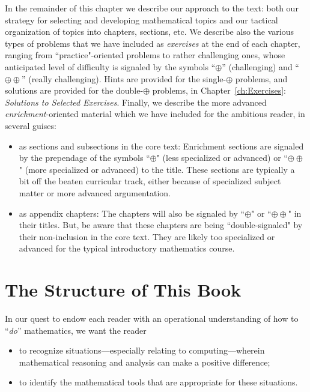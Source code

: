 \bigskip

In the remainder of this chapter we describe our approach to the text: both our strategy for selecting and developing mathematical topics and our tactical organization of topics into chapters, sections, etc.  We describe also the various types of problems that we have included
as {\em exercises} at the end of each chapter, ranging from ``practice"-oriented problems to rather challenging ones, whose anticipated level of difficulty is signaled by the symbols ``$\oplus$'' (challenging) and ``$\oplus \oplus$'' (really challenging).  Hints are provided for the single-$\oplus$ problems, and solutions are provided for the double-$\oplus$ problems, in Chapter~\ref{ch:Exercises}: {\it Solutions to Selected Exercises}.  Finally, we describe the more advanced {\em enrichment}-oriented material which we have included for the ambitious reader, in several guises:
\begin{itemize}
\item
as sections and subsections in the core text: Enrichment sections are signaled by the prependage of the symbols ``$\oplus$" (less specialized or advanced) or ``$\oplus \oplus$" (more specialized or advanced) to the title.  These sections are typically a bit off the beaten curricular track, either because of specialized subject matter or more advanced argumentation.
\medskip\item
as appendix chapters: The chapters will also be signaled by ``$\oplus$" or ``$\oplus \oplus$" in their titles.  But, be aware that these chapters are being ``double-signaled" by their non-inclusion in the core text.  They are likely too specialized or advanced for the typical introductory mathematics course.
\end{itemize}


\section{The Structure of This Book}
\label{sec:thisbook}

In our quest to endow each reader with an operational understanding of how to ``{\em do}'' mathematics, we want the reader
\begin{itemize}
\item
to recognize situations---especially relating to computing---wherein mathematical reasoning and analysis can make a positive difference;
\medskip\item
to identify the mathematical tools that are appropriate for these situations.
\end{itemize}


